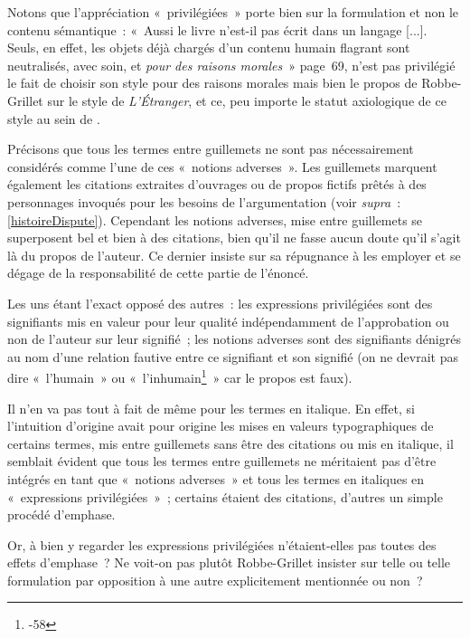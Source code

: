 \documentclass[12pt, a4paper]{article}
\begin{document}
Notons que l'appréciation «~privilégiées~» porte bien sur la formulation et non le contenu sémantique~: «~Aussi le livre n’est-il pas écrit dans un langage [...]. Seuls, en effet, les objets déjà chargés d’un contenu humain flagrant sont neutralisés, avec soin, et \textit{pour des raisons morales}~» page~69, n'est pas privilégié le fait de choisir son style pour des raisons morales mais bien le propos de Robbe-Grillet sur le style de \textit{L'Étranger}, et ce, peu importe le statut axiologique de ce style au sein de \punr{}.

Précisons que tous les termes entre guillemets ne sont pas nécessairement considérés comme l'une de ces «~notions adverses~». Les guillemets marquent également les citations extraites d'ouvrages ou de propos fictifs prêtés à des personnages invoqués pour les besoins de l'argumentation (voir \textit{supra}~: \ref{histoireDispute}). Cependant les notions adverses, mise entre guillemets se superposent bel et bien à des citations, bien qu'il ne fasse aucun doute qu'il s'agit là du propos de l'auteur. Ce dernier insiste sur sa répugnance à les employer et se dégage de la responsabilité de cette partie de l'énoncé. 

Les uns étant l'exact opposé des autres~: les expressions privilégiées sont des signifiants mis en valeur pour leur qualité indépendamment de l'approbation ou non de l'auteur sur leur signifié~; les notions adverses sont des signifiants dénigrés au nom d'une relation fautive entre ce signifiant et son signifié (on ne devrait pas dire «~l'humain~» ou «~l'inhumain\footnote{-58}~» car le propos est faux).


Il n'en va pas tout à fait de même pour les termes en italique. En effet, si l'intuition d'origine avait pour origine les mises en valeurs typographiques de certains termes, mis entre guillemets sans être des citations ou mis en italique, il semblait évident que tous les termes entre guillemets ne méritaient pas d'être intégrés en tant que «~notions adverses~» et tous les termes en italiques en «~expressions privilégiées~»~; certains étaient des citations, d'autres un simple procédé d'emphase.

Or, à bien y regarder les expressions privilégiées n'étaient-elles pas toutes des effets d'emphase~? Ne voit-on pas plutôt Robbe-Grillet insister sur telle ou telle formulation par opposition à une autre explicitement mentionnée ou non~? 
\end{document}
